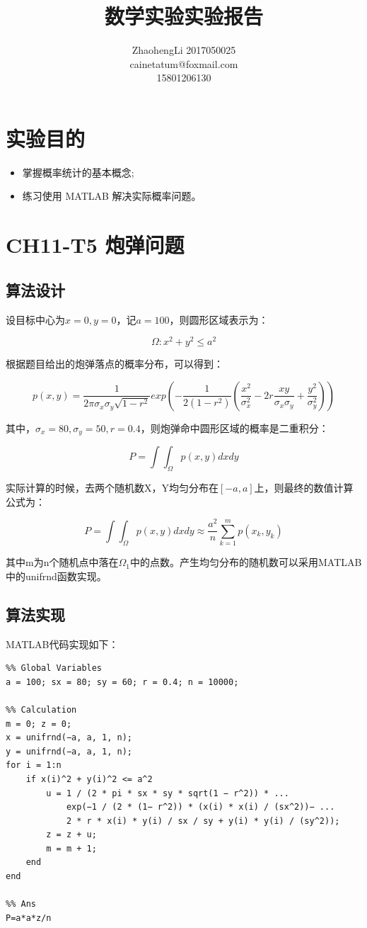 \documentclass{article}
\title{数学实验实验报告}
\author{ZhaohengLi 2017050025\\cainetatum@foxmail.com\\15801206130}
\begin{document}
\maketitle
\section{实验目的}
\begin{itemize}
	\item{掌握概率统计的基本概念;}
	\item{练习使用 MATLAB 解决实际概率问题。}
\end{itemize}


\section{CH11-T5 炮弹问题}
\subsection{算法设计}
设目标中心为$x=0,y=0$，记$a=100$，则圆形区域表示为：

$$\Omega:x^2+y^2\leq a^2$$

根据题目给出的炮弹落点的概率分布，可以得到：

$$p(x,y)=\frac{1}{2\pi\sigma_x\sigma_y\sqrt{1-r^2}}exp(-\frac{1}{2(1-r^2)}(\frac{x^2}{\sigma^2_x}-2r\frac{xy}{\sigma_x\sigma_y}+\frac{y^2}{\sigma^2_y}))$$

其中，$\sigma_x=80,\sigma_y=50,r=0.4$，则炮弹命中圆形区域的概率是二重积分：

$$P=\int\int_\Omega p(x,y)dxdy$$

实际计算的时候，去两个随机数X，Y均匀分布在$[-a,a]$上，则最终的数值计算公式为：

$$P=\int\int_\Omega p(x,y)dxdy\approx \frac{a^2}{n}\sum^m_{k=1}p(x_k,y_k)$$

其中m为n个随机点中落在$\Omega_1$中的点数。产生均匀分布的随机数可以采用MATLAB中的unifrnd函数实现。


\subsection{算法实现}

MATLAB代码实现如下：

\begin{lstlisting}
%% Global Variables
a = 100; sx = 80; sy = 60; r = 0.4; n = 10000;

%% Calculation
m = 0; z = 0;
x = unifrnd(−a, a, 1, n);
y = unifrnd(−a, a, 1, n);
for i = 1:n
	if x(i)^2 + y(i)^2 <= a^2
		u = 1 / (2 * pi * sx * sy * sqrt(1 − r^2)) * ...
			exp(−1 / (2 * (1− r^2)) * (x(i) * x(i) / (sx^2))− ...
    		2 * r * x(i) * y(i) / sx / sy + y(i) * y(i) / (sy^2));
		z = z + u;
		m = m + 1;
	end
end

%% Ans
P=a*a*z/n

\end{lstlisting}
\end{document}
